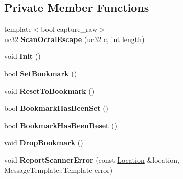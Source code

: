 \subsection*{Private Member Functions}
\begin{DoxyCompactItemize}
\item 
{\footnotesize template$<$bool capture\+\_\+raw$>$ }\\uc32 {\bfseries Scan\+Octal\+Escape} (uc32 c, int length)\hypertarget{classv8_1_1internal_1_1_scanner_ac6f7345ef7b5a2d8ea8de72826b105d9}{}\label{classv8_1_1internal_1_1_scanner_ac6f7345ef7b5a2d8ea8de72826b105d9}

\item 
void {\bfseries Init} ()\hypertarget{classv8_1_1internal_1_1_scanner_ac03e3e8799317152acf8dd2919625276}{}\label{classv8_1_1internal_1_1_scanner_ac03e3e8799317152acf8dd2919625276}

\item 
bool {\bfseries Set\+Bookmark} ()\hypertarget{classv8_1_1internal_1_1_scanner_a63e856a83d80ac276593086d4f0da577}{}\label{classv8_1_1internal_1_1_scanner_a63e856a83d80ac276593086d4f0da577}

\item 
void {\bfseries Reset\+To\+Bookmark} ()\hypertarget{classv8_1_1internal_1_1_scanner_a2c008123d72ca7ec5c4b090561c805f0}{}\label{classv8_1_1internal_1_1_scanner_a2c008123d72ca7ec5c4b090561c805f0}

\item 
bool {\bfseries Bookmark\+Has\+Been\+Set} ()\hypertarget{classv8_1_1internal_1_1_scanner_ac3a9c10b3869af49be1785a13fab042d}{}\label{classv8_1_1internal_1_1_scanner_ac3a9c10b3869af49be1785a13fab042d}

\item 
bool {\bfseries Bookmark\+Has\+Been\+Reset} ()\hypertarget{classv8_1_1internal_1_1_scanner_a7b3beb538f21ad508ea189330d07de23}{}\label{classv8_1_1internal_1_1_scanner_a7b3beb538f21ad508ea189330d07de23}

\item 
void {\bfseries Drop\+Bookmark} ()\hypertarget{classv8_1_1internal_1_1_scanner_a3b6c129ca64a074af9ac74d3f81f8a4f}{}\label{classv8_1_1internal_1_1_scanner_a3b6c129ca64a074af9ac74d3f81f8a4f}

\item 
void {\bfseries Report\+Scanner\+Error} (const \hyperlink{structv8_1_1internal_1_1_scanner_1_1_location}{Location} \&location, Message\+Template\+::\+Template error)\hypertarget{classv8_1_1internal_1_1_scanner_a35e42ffe31e591140cf2018434714399}{}\label{classv8_1_1internal_1_1_scanner_a35e42ffe31e591140cf2018434714399}


\end{DoxyCompactItemize}
